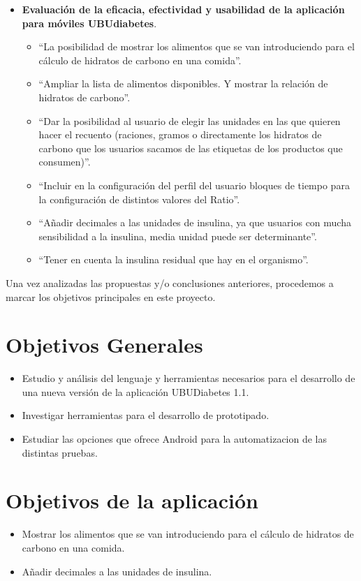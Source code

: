 \begin{itemize}
	\item \textbf{Evaluación de la eficacia, efectividad y usabilidad de la aplicación para móviles UBUdiabetes}\cite{bruno2017}.
	\begin{itemize}
		\item ``La posibilidad de mostrar los alimentos que se van introduciendo para el cálculo de hidratos de carbono en una comida''.
		\item ``Ampliar la lista de alimentos disponibles. Y mostrar la relación de hidratos de carbono''.
		\item ``Dar la posibilidad al usuario de elegir las unidades en las que quieren hacer el recuento (raciones, gramos o directamente los hidratos de carbono que los usuarios sacamos de las etiquetas de los productos que consumen)''.
		\item ``Incluir en la configuración del perfil del usuario bloques de tiempo para la configuración de distintos valores del Ratio''.
		\item ``Añadir decimales a las unidades de insulina, ya que usuarios con mucha sensibilidad a la insulina, media unidad 	puede ser determinante''.
		\item ``Tener en cuenta la insulina residual que hay en el organismo''.
	\end{itemize}
\end{itemize}
Una vez analizadas las propuestas y/o conclusiones anteriores, procedemos a marcar los objetivos principales en este proyecto.
\section{ Objetivos Generales}
	\begin{itemize}
		\item Estudio y análisis del lenguaje y herramientas necesarios para el desarrollo de una nueva versión de la aplicación UBUDiabetes 1.1.
		\item Investigar herramientas para el desarrollo de prototipado.
		\item Estudiar las opciones que ofrece Android para la automatizacion de las distintas pruebas.
		
	\end{itemize}

\section{ Objetivos de la aplicación}
	\begin{itemize}
		\item Mostrar los alimentos que se van introduciendo para el cálculo de hidratos de carbono en una comida.
		\item Añadir decimales a las unidades de insulina.
		
	\end{itemize}
